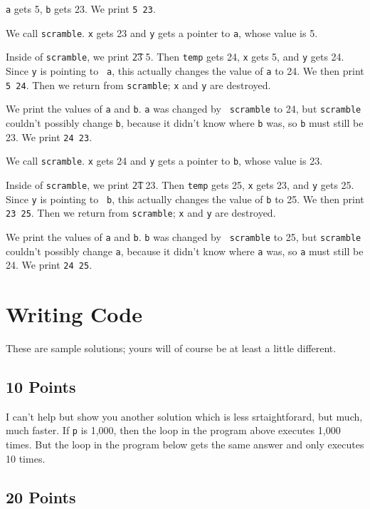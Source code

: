 {\tt a} gets 5, {\tt b} gets 23.  We print {\tt 5 23}.

We call {\tt scramble}.  {\tt x} gets 23 and {\tt y} gets a pointer to
{\tt a}, whose value is 5.

Inside of {\tt scramble}, we print {\t 23 5}.  Then {\tt temp} gets 24,
{\tt x} gets 5, and {\tt *y} gets 24.  Since {\tt y} is pointing to {\tt
a}, this actually changes the value of {\tt a} to 24.  We then print
{\tt 5 24}.  Then we return from {\tt scramble}; {\tt x} and {\tt y} are
destroyed.  

We print the values of {\tt a} and {\tt b}.  {\tt a} was changed by {\tt
scramble} to 24, but {\tt scramble} couldn't possibly change {\tt b},
because it didn't know where {\tt b} was, so {\tt b} must still be 23.
We print {\tt 24 23}.

We call {\tt scramble}.  {\tt x} gets 24 and {\tt y} gets a pointer to
{\tt b}, whose value is 23.

Inside of {\tt scramble}, we print {\t 24 23}.  Then {\tt temp} gets 25,
{\tt x} gets 23, and {\tt *y} gets 25.  Since {\tt y} is pointing to {\tt
b}, this actually changes the value of {\tt b} to 25.  We then print
{\tt 23 25}.  Then we return from {\tt scramble}; {\tt x} and {\tt y} are
destroyed.  

We print the values of {\tt a} and {\tt b}.  {\tt b} was changed by {\tt
scramble} to 25, but {\tt scramble} couldn't possibly change {\tt a},
because it didn't know where {\tt a} was, so {\tt a} must still be 24.
We print {\tt 24 25}.

\section{Writing Code}

These are sample solutions; yours will of course be at least a little
different. 

\subsection{10 Points}


I can't help but show you another solution which is less srtaightforard,
but much, much faster.  If {\tt p} is 1,000, then the loop in the
program above executes 1,000 times.  But the loop in the program below
gets the same answer and only executes 10 times.  



\subsection{20 Points}


